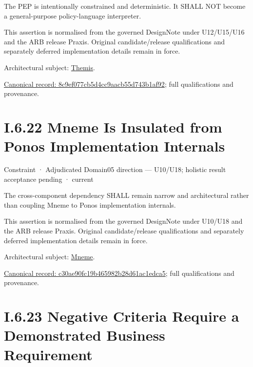 The PEP is intentionally constrained and deterministic. It SHALL NOT become a general-purpose policy-language interpreter.



This assertion is normalised from the governed DesignNote under U12/U15/U16 and the ARB release Praxis. Original candidate/release qualifications and separately deferred implementation details remain in force.



Architectural subject: \hyperref[element:899d34ec491948b68aad09e507dea6d1]{Themis}.


{\footnotesize \href{../../../../continuum/motivation/constraint/8c9ef077cb5d4cc9aacb55d743b1af92.md}{Canonical record: 8c9ef077cb5d4cc9aacb55d743b1af92}; full qualifications and provenance.}\par
\section*{I.6.22 Mneme Is Insulated from Ponos Implementation Internals}
\label{navigation:I.6.22}

\label{element:c30ae90fc19b465982b28d61ac1edca5}
{\small Constraint · Adjudicated Domain05 direction — U10/U18; holistic result acceptance pending · current}\par

The cross-component dependency SHALL remain narrow and architectural rather than coupling Mneme to Ponos implementation internals.



This assertion is normalised from the governed DesignNote under U10/U18 and the ARB release Praxis. Original candidate/release qualifications and separately deferred implementation details remain in force.



Architectural subject: \hyperref[element:1af8a56358f7429fabfb57be66542a99]{Mneme}.


{\footnotesize \href{../../../../continuum/motivation/constraint/c30ae90fc19b465982b28d61ac1edca5.md}{Canonical record: c30ae90fc19b465982b28d61ac1edca5}; full qualifications and provenance.}\par
\section*{I.6.23 Negative Criteria Require a Demonstrated Business Requirement}
\label{navigation:I.6.23}

